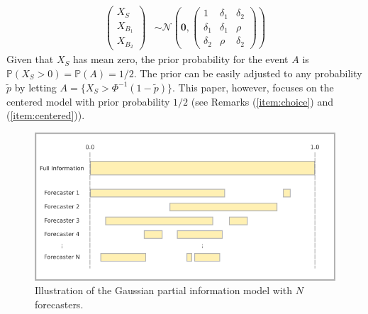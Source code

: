 \documentclass[11pt]{article}
\renewcommand{\P}{\mathbb{P}}
\theoremstyle{definition}
\theoremstyle{definition}
\def\P{{\mathbb P}}
\begin{document}
\begin{align}
\left(\begin{matrix} X_S \\ X_{B_1}\\ X_{B_2} \end{matrix}\right) 
 &\sim \mathcal{N}\left(
 \boldsymbol{0},  \left(\begin{matrix} 
1 & \delta_1 & \delta_2\\
\delta_1 & \delta_1 &\rho\\
\delta_2 & \rho & \delta_2
 \end{matrix}\right)\right) \label{twoforecasters}
\end{align}
Given that $X_S$ has mean zero, the prior probability for the event $A$ is
$\P(X_S > 0) = \P(A) = 1/2$. The prior can be easily adjusted to any probability
$\tilde{p}$ by letting $A = \{ X_S > \Phi^{-1}(1-\tilde{p}) \}$. This
paper, however, focuses on the centered model with prior probability
$1/2$ (see Remarks (\ref{item:choice}) and (\ref{item:centered})).

\begin{figure}[t]
   \includegraphics[width = \textwidth]{N=N} %
   \caption{Illustration of the Gaussian partial information model with $N$ forecasters.}
   \label{diagramN}
\end{figure}
\end{document}
